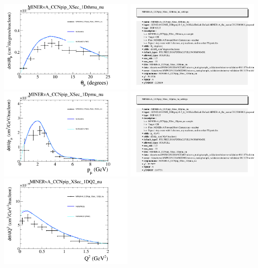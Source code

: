 \documentclass{article}
\begin{document}
\centering
\includegraphics[width=0.49\textwidth]{figures/nuisance_MINERvA_CCNpip_XSec_1Dthmu_nu_comp.png}
\includegraphics[width=0.49\textwidth]{figures/nuisance_MINERvA_CCNpip_XSec_1Dthmu_nu_info.png}
\centering
\includegraphics[width=0.49\textwidth]{figures/nuisance_MINERvA_CCNpip_XSec_1Dpmu_nu_comp.png}
\includegraphics[width=0.49\textwidth]{figures/nuisance_MINERvA_CCNpip_XSec_1Dpmu_nu_info.png}
\centering
\includegraphics[width=0.49\textwidth]{figures/nuisance_MINERvA_CCNpip_XSec_1DQ2_nu_comp.png}
\end{document}
